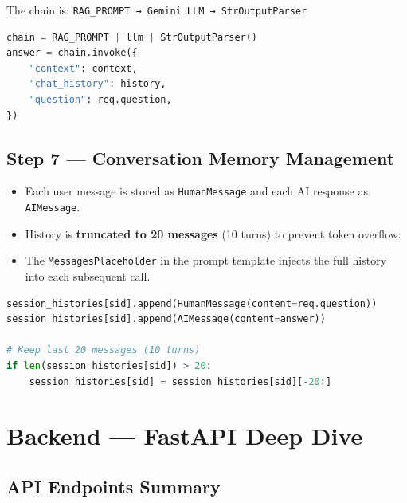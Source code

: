 \documentclass[12pt,a4paper]{article}
\begin{document}
The chain is: \texttt{RAG\_PROMPT → Gemini LLM → StrOutputParser}

\begin{lstlisting}[language=Python, caption={Chain execution}]
chain = RAG_PROMPT | llm | StrOutputParser()
answer = chain.invoke({
    "context": context,
    "chat_history": history,
    "question": req.question,
})
\end{lstlisting}

\subsection{Step 7 — Conversation Memory Management}

\begin{itemize}
  \item Each user message is stored as \texttt{HumanMessage} and each AI response as \texttt{AIMessage}.
  \item History is \textbf{truncated to 20 messages} (10 turns) to prevent token overflow.
  \item The \texttt{MessagesPlaceholder} in the prompt template injects the full history into each subsequent call.
\end{itemize}

\begin{lstlisting}[language=Python, caption={History management}]
session_histories[sid].append(HumanMessage(content=req.question))
session_histories[sid].append(AIMessage(content=answer))

# Keep last 20 messages (10 turns)
if len(session_histories[sid]) > 20:
    session_histories[sid] = session_histories[sid][-20:]
\end{lstlisting}

\section{Backend — FastAPI Deep Dive}

\subsection{API Endpoints Summary}
\end{document}
